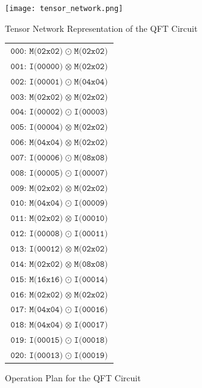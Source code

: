 \documentclass[12pt,oneside,a4paper]{article}
\begin{document}
\begin{figure}
    \centering
    \begin{minipage}{.45\textwidth}
        \centering
        \texttt{[image: tensor\_network.png]}
        \caption{Tensor Network Representation of the QFT Circuit}
        \label{fig:tensor-network}
    \end{minipage}%
    \hfill
    \begin{minipage}{.45\textwidth}
        \centering
        \begin{tabular}{c}
            $\texttt{000: M(02x02)}\;\odot\;\texttt{M(02x02)}$ \\
            $\texttt{001: I(00000)}\;\otimes\;\texttt{M(02x02)}$ \\
            $\texttt{002: I(00001)}\;\odot\;\texttt{M(04x04)}$ \\
            $\texttt{003: M(02x02)}\;\otimes\;\texttt{M(02x02)}$ \\
            $\texttt{004: I(00002)}\;\odot\;\texttt{I(00003)}$ \\
            $\texttt{005: I(00004)}\;\otimes\;\texttt{M(02x02)}$ \\
            $\texttt{006: M(04x04)}\;\otimes\;\texttt{M(02x02)}$ \\
            $\texttt{007: I(00006)}\;\odot\;\texttt{M(08x08)}$ \\
            $\texttt{008: I(00005)}\;\odot\;\texttt{I(00007)}$ \\
            $\texttt{009: M(02x02)}\;\otimes\;\texttt{M(02x02)}$ \\
            $\texttt{010: M(04x04)}\;\odot\;\texttt{I(00009)}$ \\
            $\texttt{011: M(02x02)}\;\otimes\;\texttt{I(00010)}$ \\
            $\texttt{012: I(00008)}\;\odot\;\texttt{I(00011)}$ \\
            $\texttt{013: I(00012)}\;\otimes\;\texttt{M(02x02)}$ \\
            $\texttt{014: M(02x02)}\;\otimes\;\texttt{M(08x08)}$ \\
            $\texttt{015: M(16x16)}\;\odot\;\texttt{I(00014)}$ \\
            $\texttt{016: M(02x02)}\;\otimes\;\texttt{M(02x02)}$ \\
            $\texttt{017: M(04x04)}\;\odot\;\texttt{I(00016)}$ \\
            $\texttt{018: M(04x04)}\;\otimes\;\texttt{I(00017)}$ \\
            $\texttt{019: I(00015)}\;\odot\;\texttt{I(00018)}$ \\
            $\texttt{020: I(00013)}\;\odot\;\texttt{I(00019)}$
        \end{tabular}
        \caption{Operation Plan for the QFT Circuit}
        \label{fig:operation-plan}
    \end{minipage}
\end{figure}
\end{document}
